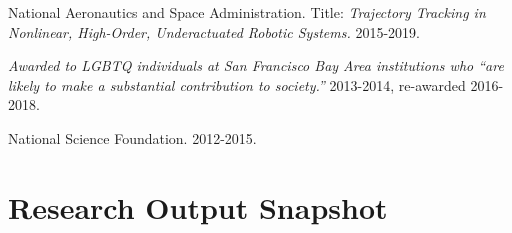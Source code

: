 \documentclass[letterpaper]{deedy-resume} %
\newcommand\Tstrut{\rule{0pt}{2.6ex}}         %
\begin{document}
{\begin{etaremune}[itemsep=0.05cm]
\item {{} National Aeronautics and Space Administration. Title: {\it Trajectory Tracking in Nonlinear, High-Order, Underactuated Robotic Systems.} 2015-2019.}
  

\item {{} {\it Awarded to LGBTQ individuals at San Francisco Bay Area institutions who ``are likely to make a substantial contribution to society.''} 2013-2014, re-awarded 2016-2018.}

\item {{} National Science Foundation. 2012-2015.}

\end{etaremune}


\vspace{0.2cm}
\section{Research Output Snapshot}
 

}
\end{document}
